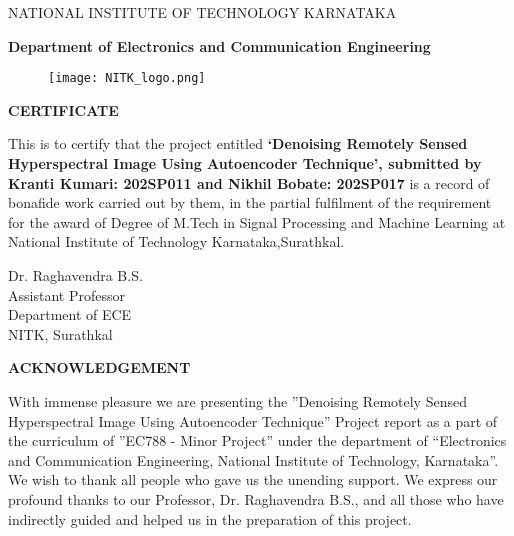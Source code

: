 \documentclass{article}
\begin{document}
\newpage

\begin{center}
\large NATIONAL INSTITUTE OF TECHNOLOGY KARNATAKA
\end{center}
\begin{center}
\textbf{\large Department of Electronics and Communication Engineering}
\end{center}

\begin{figure}[htp]
    \centering
    \Large\texttt{[image: NITK\_logo.png]}
    \label{fig:logo2}
\end{figure}

\begin{center}
\textbf{\Large CERTIFICATE}
\end{center}

\begin{center}
\end{center}

\large This is to certify that the project entitled \textbf{‘Denoising Remotely Sensed Hyperspectral Image Using Autoencoder Technique’, submitted by Kranti Kumari: 202SP011 and Nikhil Bobate: 202SP017} is a record of bonafide work carried out by them, in the partial fulfilment of the requirement for the award of Degree of M.Tech in Signal Processing and Machine Learning at National Institute of Technology Karnataka,Surathkal.


\begin{center}
\end{center}
\begin{center}
\end{center}


\begin{flushleft}
Dr. Raghavendra B.S.\\
Assistant Professor\\
Department of ECE\\
NITK, Surathkal
\end{flushleft}


\newpage

\begin{center}
\textbf{\Large ACKNOWLEDGEMENT}
\end{center}

\begin{center}
\end{center}
\begin{center}
\end{center}

With immense pleasure we are presenting the ”Denoising Remotely Sensed Hyperspectral Image Using Autoencoder Technique” Project report as a part of the curriculum of ”EC788 - Minor Project” under the department of “Electronics and Communication Engineering, National Institute of Technology, Karnataka”. We wish to thank all people who gave us the unending support. We express our profound thanks to our Professor, Dr. Raghavendra B.S., and all those who have indirectly guided and helped us in the preparation of this project.
\end{document}
